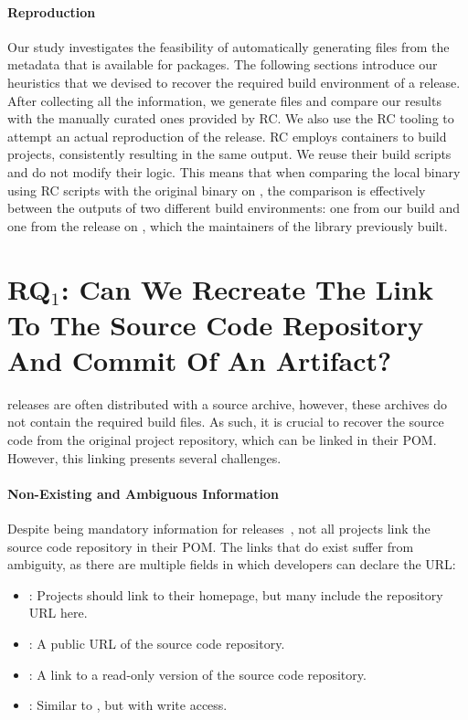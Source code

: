\documentclass[smallextended]{svjour3}
\newcommand{\RQ}[1]{RQ$_{#1}$}
\newcommand{\maven}[1]{\tool{Maven{#1}}}
\begin{document}
\paragraph{Reproduction}
Our study investigates the feasibility of automatically generating  files from the metadata that is available for \maven{} packages. The following sections introduce our heuristics that we devised to recover the required build environment of a release. After collecting all the information, we generate  files and compare our results with the manually curated ones provided by RC. We also use the RC tooling to attempt an actual reproduction of the release. RC employs  containers to build projects, consistently resulting in the same output. We reuse their build scripts and do not modify their logic. This means that when comparing the local binary using RC scripts with the original binary on \maven{}, the comparison is effectively between the outputs of two different build environments: one from our build and one from the release on \maven{}, which the maintainers of the library previously built.


\section{\RQ{1}: Can We Recreate The Link To The Source Code Repository And Commit Of An Artifact?}
\label{sec:rq1}

\maven{} releases are often distributed with a source archive, however, these archives do not contain the required build files. As such, it is crucial to recover the source code from the original project repository, which can be linked in their POM.
However, this linking presents several challenges.

\paragraph{Non-Existing and Ambiguous Information}
Despite being mandatory information for \maven{} releases~\cite{mvnSCMRequirement}, not all projects link the source code repository in their POM. The links that do exist suffer from ambiguity, as there are multiple fields in which developers can declare the URL:

\begin{itemize}
%
\item {}: Projects should link to their homepage, but many include the repository URL here.
%
\item {}: A public URL of the source code repository.
%
\item {}: A link to a read-only version of the source code repository.
%
\item {}: Similar to , but with write access.
\end{itemize}
\end{document}

